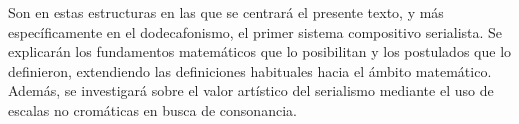 		Son en estas estructuras en las que se centrará el presente texto, y más específicamente en el dodecafonismo, el primer sistema compositivo serialista. Se explicarán los fundamentos matemáticos que lo posibilitan y los postulados que lo definieron, extendiendo las definiciones habituales hacia el ámbito matemático. Además, se investigará sobre el valor artístico del serialismo mediante el uso de escalas no cromáticas en busca de consonancia.
        
        
        
        
    
    \renewcommand*\contentsname{\begin{LARGE}\textbf{Índice general}\end{LARGE}\vspace{-\bigskipamount}}
	\begin{changemargin}{-0.5cm}{-0.5cm}
		\tableofcontents
	\end{changemargin}
	\newpage
	$\ $
	\thispagestyle{empty}
	\newpage
	$\ $
	\thispagestyle{empty}
	\newpage
	
	\pagestyle{fancy}